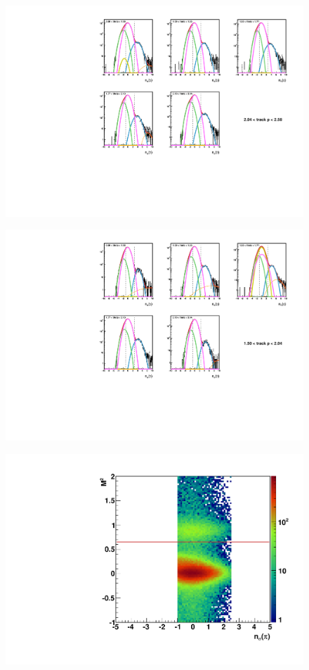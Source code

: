 \documentclass[abstract = on,listof=totoc, bibliography=totoc]{scrreprt}
\begin{document}
 \begin{figure}
\begin{center}
\includegraphics[width = .7\textwidth]{5gausFit_pbin_1.pdf}
\caption[]{}
\label{fig:5gaus1}
\end{center}
\end{figure}

 \begin{figure}
\begin{center}
\includegraphics[width = .7\textwidth]{5gausFit_pbin_0.pdf}
\caption[]{}
\label{fig:5gaus0}
\end{center}
\end{figure}

 \begin{figure}
\begin{center}
\includegraphics[width = .7\textwidth]{tofPlot.pdf}
\caption[]{}
\label{fig:tofPlot}
\end{center}
\end{figure}
\end{document}
